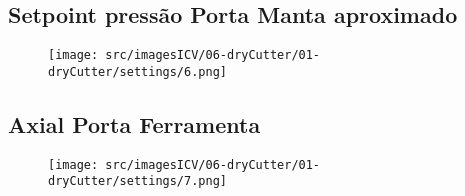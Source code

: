 \newpage
\thispagestyle{fancy}
\vspace{\fill}
\subsection{Setpoint pressão Porta Manta aproximado}
\begin{figure}
    \centering
    \texttt{[image: src/imagesICV/06-dryCutter/01-dryCutter/settings/6.png]}
\end{figure}

\newpage
\thispagestyle{fancy}
\vspace{\fill}
\subsection{Axial Porta Ferramenta}
\begin{figure}
    \centering
    \texttt{[image: src/imagesICV/06-dryCutter/01-dryCutter/settings/7.png]}
\end{figure}
